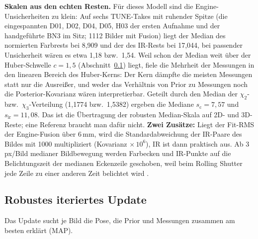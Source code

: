 \documentclass[11pt,a4paper,fleqn]{article}
\begin{document}
\textbf{Skalen aus den echten Resten.} Für dieses Modell sind die Engine-Unsicherheiten zu klein: Auf sechs
TUNE-Takes mit ruhender Spitze (die eingespannten D01, D02, D04, D05, H03 der ersten Aufnahme und der
handgeführte BN3 im Sitz; 1112
Bilder mit Fusion) liegt der Median des normierten Farbrests bei 8,909 und der des IR-Rests bei 17,044, bei
passender Unsicherheit wären es etwa 1,18 bzw.\ 1,54. Weil schon der Median weit über der Huber-Schwelle
$c = 1{,}5$ (Abschnitt~\ref{sec:update}) liegt, fiele die Mehrheit der Messungen in den linearen Bereich des
Huber-Kerns: Der Kern dämpfte die meisten Messungen statt nur die Ausreißer, und weder das Verhältnis von Prior zu
Messungen noch die Posterior-Kovarianz wären interpretierbar. Geteilt durch den Median der $\chi_2$- bzw.\
$\chi_3$-Verteilung (1,1774 bzw.\ 1,5382) ergeben die Mediane $s_{\mathrm{c}} = 7{,}57$ und
$s_{\mathrm{ir}} = 11{,}08$. Das ist die Übertragung der robusten Median-Skala \cite[Gl.~(28)]{zhang1997parameter}
auf 2D- und 3D-Reste; eine Referenz braucht man dafür nicht. \textbf{Zwei Zusätze:} Liegt der Fit-RMS der
Engine-Fusion über 6\,mm, wird die Standardabweichung der IR-Paare des Bildes mit 1000 multipliziert (Kovarianz
$\times\,10^6$), IR ist dann praktisch aus. Ab 3\,px/Bild
medianer Bildbewegung werden Farbecken und IR-Punkte auf die Belichtungszeit der medianen Eckenzeile geschoben,
weil beim Rolling Shutter jede Zeile zu einer anderen Zeit belichtet wird \cite[§2]{meingast2005geometric}.

\subsection{Robustes iteriertes Update}
\label{sec:update}

Das Update sucht je Bild die Pose, die Prior und Messungen zusammen am besten erklärt (MAP).
\end{document}

